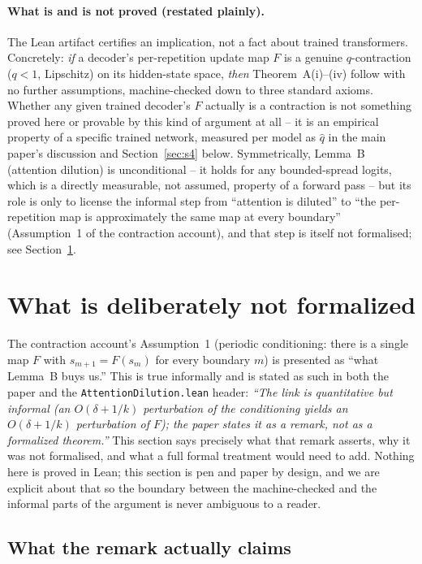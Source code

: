 \documentclass[11pt]{article}
\begin{document}
\paragraph{What is and is not proved (restated plainly).} The Lean artifact
certifies an implication, not a fact about trained transformers.
Concretely: \emph{if} a decoder's per-repetition update map $F$ is a genuine
$q$-contraction ($q<1$, Lipschitz) on its hidden-state space, \emph{then}
Theorem~A(i)--(iv) follow with no further assumptions, machine-checked down to
three standard axioms. Whether any given trained decoder's $F$ actually is a
contraction is not something proved here or provable by this kind of
argument at all -- it is an empirical property of a specific trained network,
measured per model as $\hat q$ in the main paper's discussion and
Section~\ref{sec:s4} below. Symmetrically, Lemma~B (attention dilution) is
unconditional -- it holds for any bounded-spread logits, which is a directly
measurable, not assumed, property of a forward pass -- but its role is only to
license the informal step from ``attention is diluted'' to ``the
per-repetition map is approximately the same map at every boundary''
(Assumption~1 of the contraction account), and that step is itself not formalised; see
Section~\ref{sec:s2}.

\section{What is deliberately not formalized}
\label{sec:s2}

The contraction account's Assumption~1 (periodic conditioning: there is a single map
$F$ with $s_{m+1}=F(s_m)$ for every boundary $m$) is presented as ``what
Lemma~B buys us.'' This is true informally and is stated as such in both the
paper and the \texttt{AttentionDilution.lean} header: \emph{``The link is
quantitative but informal (an $O(\delta+1/k)$ perturbation of the conditioning
yields an $O(\delta+1/k)$ perturbation of $F$); the paper states it as a
remark, not as a formalized theorem.''} This section says precisely what that
remark asserts, why it was not formalised, and what a full formal treatment
would need to add. Nothing here is proved in Lean; this section is pen and
paper by design, and we are explicit about that so the boundary between the
machine-checked and the informal parts of the argument is never ambiguous to
a reader.

\subsection{What the remark actually claims}
\end{document}

